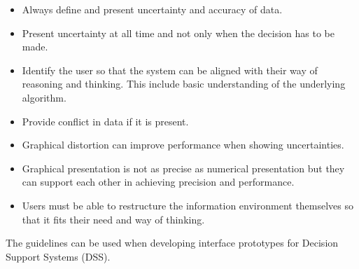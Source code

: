\begin{itemize}
\item Always define and present uncertainty and accuracy of data.
\item Present uncertainty at all time and not only when the decision has to be made.
\item Identify the user so that the system can be aligned with their way of reasoning and thinking. This include basic understanding of the underlying algorithm.
\item Provide conflict in data if it is present.
\item Graphical distortion can improve performance when showing uncertainties.
\item Graphical presentation is not as precise as numerical presentation but they can support each other in achieving precision and performance.
\item Users must be able to restructure the information environment themselves so that it fits their need and way of thinking.
\end{itemize}
The guidelines can be used when developing interface prototypes for Decision Support Systems (DSS).
